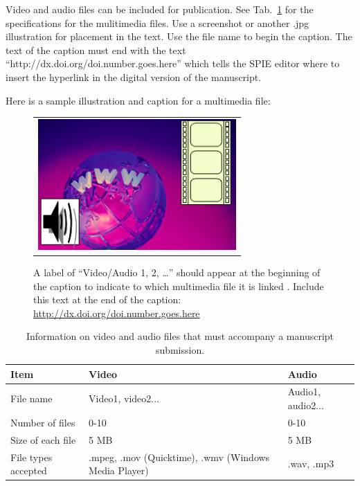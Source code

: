 \documentclass[]{spie}  %
\begin{document}
Video and audio files can be included for publication. See Tab.~\ref{tab:Multimedia-Specifications} for the specifications for the mulitimedia files. Use a screenshot or another .jpg illustration for placement in the text. Use the file name to begin the caption. The text of the caption must end with the text ``http://dx.doi.org/doi.number.goes.here'' which tells the SPIE editor where to insert the hyperlink in the digital version of the manuscript. 

Here is a sample illustration and caption for a multimedia file:

   \begin{figure} [ht]
   \begin{center}
   \begin{tabular}{c} 
   \includegraphics[height=5cm]{MultimediaFigure.jpg}
	\end{tabular}
	\end{center}
   \caption[example] 
   { \label{fig:video-example} 
A label of “Video/Audio 1, 2, …” should appear at the beginning of the caption to indicate to which multimedia file it is linked . Include this text at the end of the caption: \url{http://dx.doi.org/doi.number.goes.here}}
   \end{figure} 
   
   \begin{table}[ht]
\caption{Information on video and audio files that must accompany a manuscript submission.} 
\label{tab:Multimedia-Specifications}
\begin{center}       
\begin{tabular}{|l|l|l|}
\hline
\rule[-1ex]{0pt}{3.5ex}  Item & Video & Audio  \\
\hline
\rule[-1ex]{0pt}{3.5ex}  File name & Video1, video2... & Audio1, audio2...   \\
\hline
\rule[-1ex]{0pt}{3.5ex}  Number of files & 0-10 & 0-10  \\
\hline
\rule[-1ex]{0pt}{3.5ex}  Size of each file & 5 MB & 5 MB  \\
\hline
\rule[-1ex]{0pt}{3.5ex}  File types accepted & .mpeg, .mov (Quicktime), .wmv (Windows Media Player) & .wav, .mp3  \\
\hline 
\end{tabular}
\end{center}
\end{table}
\end{document}
